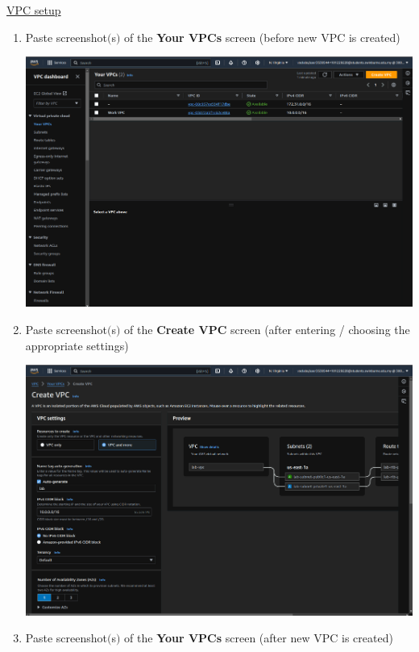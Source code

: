 \documentclass[11pt]{article}
\begin{document}
\noindent\underline{VPC setup}

\begin{enumerate}
    \item Paste screenshot$($s$)$ of the \textbf{Your VPCs} screen (before new VPC is created) \\
    \vspace{5mm}
    
    
    {\centering
    \includegraphics[width=5.8in]{pics/1.png}
    }
    
    \item Paste screenshot$($s$)$ of the \textbf{Create VPC} screen (after entering / choosing the appropriate settings) \\
    \vspace{5mm}

    {\centering
    \includegraphics[width=5.8in]{pics/2_a.png}
    }

    \item Paste screenshot$($s$)$ of the \textbf{Your VPCs} screen (after new VPC is created) \\
    \vspace{5mm}


\end{enumerate}
\end{document}
